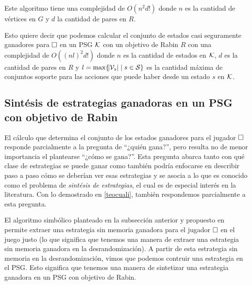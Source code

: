 Este algoritmo tiene una complejidad de $O(n^2 d!)$ donde $n$ es la cantidad de
vértices en $G$ y $d$ la cantidad de pares en $R$.

Esto quiere decir que podemos calcular el conjunto de estados casi seguramente
ganadores para $\square$ en un PSG $\mathcal{K}$ con un objetivo de Rabin $R$ con una
complejidad de $O((n l)^2 d! )$ donde $n$ es la cantidad de estados en $\mathcal{K}$,
$d$ es la cantidad de pares en $R$ y $l = \max \{\abs{\mathcal{V}_s} \mid s \in \mathcal{S} \}$
es la cantidad máxima de conjuntos soporte para las acciones que puede haber
desde un estado $s$ en $\mathcal{K}$.

\subsection*{Sintésis de estrategias ganadoras en un PSG con objetivo de Rabin}

El cálculo que determina el conjunto de los estados ganadores para el jugador
$\square$ responde parcialmente a la pregunta de ``¿quién gana?'', pero resulta
no de menor importancia el plantearse ``¿cómo se gana?''. Esta pregunta abarca
tanto con qué clase de estrategias se puede ganar como también podría enfocarse
en describir paso a paso cómo se deberían ver esas estrategias y se asocia a lo
que es conocido como el problema de \textit{sintésis de estrategias}, el cual
es de especial interés en la literatura. Con lo demostrado en \ref{teocuali},
también respondemos parcialmente a esta pregunta.

El algoritmo simbólico planteado en la subsección anterior y propuesto en
\cite{Banerjee} permite extraer una estrategia sin memoria ganadora para el
jugador $\square$ en el juego justo (lo que significa que tenemos una manera de
extraer una estrategia sin memoria ganadora en la desrandomización). A partir
de esta estrategia sin memoria en la desrandomización, vimos que podemos
contruir una estrategia en el PSG. Esto significa que tenemos una manera de
sintetizar una estrategia ganadora en un PSG con objetivo de Rabin.


